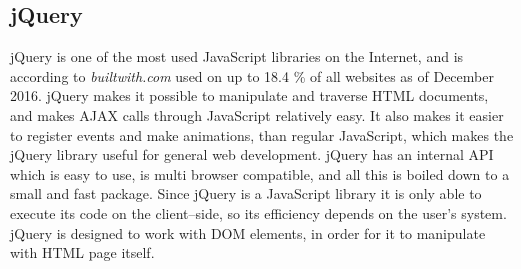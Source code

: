 \subsection{jQuery}\label{ssec:jquery}
jQuery is one of the most used JavaScript libraries on the Internet, and is according to \textit{builtwith.com} used on up to 18.4 \% of all websites as of December 2016.\cite{buildwith}
jQuery makes it possible to manipulate and traverse HTML documents, and makes \ac{AJAX} calls through JavaScript relatively easy.
It also makes it easier to register events and make animations, than regular JavaScript, which makes the jQuery library useful for general web development.
jQuery has an internal API which is easy to use, is multi browser compatible, and all this is boiled down to a small and fast package.
Since jQuery is a JavaScript library it is only able to execute its code on the client--side, so its efficiency depends on the user's system.
jQuery is designed to work with \ac{DOM} elements, in order for it to manipulate with HTML page itself.

